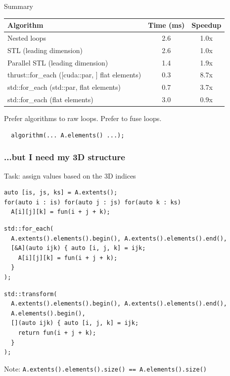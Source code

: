 \begin{frame}[fragile,label=alg-summary]{Summary}

\begin{table}
\begin{tabular}{lcc}
\textbf{Algorithm} & \textbf{Time (ms)} & \textbf{Speedup} \\
\hline
Nested loops                                    & 2.6 & 1.0x \\
STL (leading dimension)                         & 2.6 & 1.0x \\
Parallel STL (leading dimension)                & 1.4 & 1.9x \\
\hline
thrust::for\_each ([cuda::par, ] flat elements) & 0.3 & 8.7x \\
std::for\_each (std::par, flat elements)        & 0.7 & 3.7x \\
std::for\_each (flat elements)                  & 3.0 & 0.9x \\
\end{tabular}
\end{table}

\begin{alertblock}{}
  Prefer algorithms to raw loops.
  Prefer to fuse loops.
\end{alertblock}

  \begin{lstlisting}
  algorithm(... A.elements() ...);
  \end{lstlisting}

\end{frame}

\begin{frame}[fragile]
\frametitle{...but I need my 3D structure}

Task: assign values based on the 3D indices

\begin{lstlisting}
auto [is, js, ks] = A.extents();
for(auto i : is) for(auto j : js) for(auto k : ks)
  A[i][j][k] = fun(i + j + k);
\end{lstlisting}

\begin{overprint}
\begin{lstlisting}
std::for_each(
  A.extents().elements().begin(), A.extents().elements().end(),
  [&A](auto ijk) { auto [i, j, k] = ijk;
    A[i][j][k] = fun(i + j + k);
  }
);
\end{lstlisting}

\begin{lstlisting}
std::transform(
  A.extents().elements().begin(), A.extents().elements().end(),
  A.elements().begin(),
  [](auto ijk) { auto [i, j, k] = ijk;
    return fun(i + j + k);
  }
);
\end{lstlisting}

Note: \lstinline|A.extents().elements().size() == A.elements().size()|
\end{overprint}

\end{frame}

